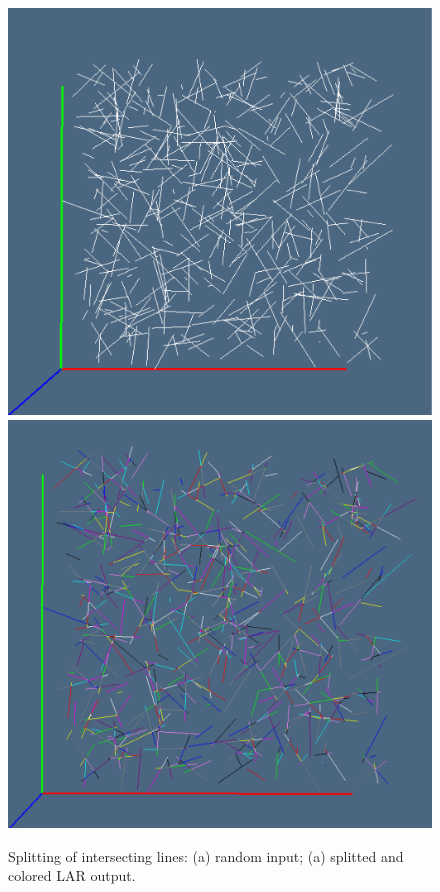 \documentclass[11pt,oneside]{article}    %
\begin{document}
\begin{figure}[htbp] %
   \centering
   \includegraphics[width=0.49\linewidth]{images/colored1} 
   \includegraphics[width=0.49\linewidth]{images/colored2} 
   \caption{Splitting of intersecting lines: (a) random input; (a) splitted and colored LAR output.}
   \label{fig:ortho}
\end{figure}
\end{document}
